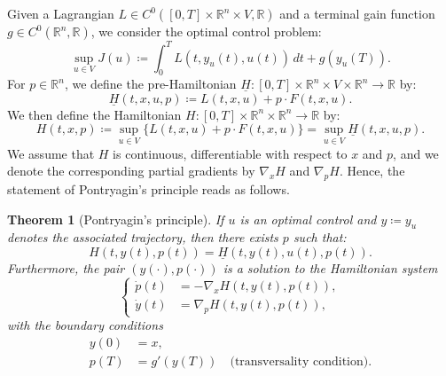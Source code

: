 \documentclass[11pt,a4paper]{article}
\numberwithin{equation}{section}
\theoremstyle{plain}
\newtheorem{theorem}{Theorem}[section]
\theoremstyle{remark}
\begin{document}
Given a Lagrangian $L \in C^0([0, T] \times \mathbb{R}^n \times V, \mathbb{R})$ and a terminal gain function $g \in C^0(\mathbb{R}^n, \mathbb{R})$, we consider the optimal control problem:
\begin{equation}
\sup_{u\in V} J(u) \coloneqq \int_0^T L(t, y_u(t), u(t)) \, dt + g(y_u(T)).
\end{equation}
For $p \in \mathbb{R}^n$, we define the pre-Hamiltonian $\underline{H} : [0,T] \times \mathbb{R}^n \times V \times \mathbb{R}^n \to \mathbb{R}$ by:
\begin{equation}
\underline{H}(t, x, u, p) \coloneqq L(t, x, u) + p \cdot F(t, x, u).
\end{equation}
We then define the Hamiltonian $H : [0,T] \times \mathbb{R}^n \times \mathbb{R}^n \to \mathbb{R}$ by:
\begin{equation}
H(t, x, p) \coloneqq \sup_{u \in V} \{ L(t, x, u) + p \cdot F(t, x, u) \} = \sup_{u \in V} \underline{H}(t, x, u, p).
\end{equation}
We assume that $H$ is continuous, differentiable with respect to $x$ and $p$, and we denote the corresponding partial gradients by $\nabla_x H$ and $\nabla_p H$. Hence, the statement of Pontryagin's principle reads as follows.


\begin{theorem}[Pontryagin's principle]\label{lem:Pontryagin} If $u$ is an optimal control and $y \coloneqq y_u$ denotes the associated trajectory, then there exists $p$ such that:
\begin{equation}
H(t, y(t), p(t)) = \underline{H}(t, y(t), u(t), p(t)).
\end{equation} 
Furthermore, the pair $(y(\cdot), p(\cdot))$ is a solution to the Hamiltonian system
\begin{equation*}
\begin{cases}
\dot{p}(t) &= -\nabla_x H(t, y(t), p(t)), \\
\dot{y}(t) &= \nabla_p H(t, y(t), p(t)), 
\end{cases}
\end{equation*}
with the boundary conditions
\begin{align*}
y(0) &= x, \\
p(T) &=  g'(y(T)) \quad \text{(transversality condition)}.
\end{align*}
\end{theorem}
\end{document}
